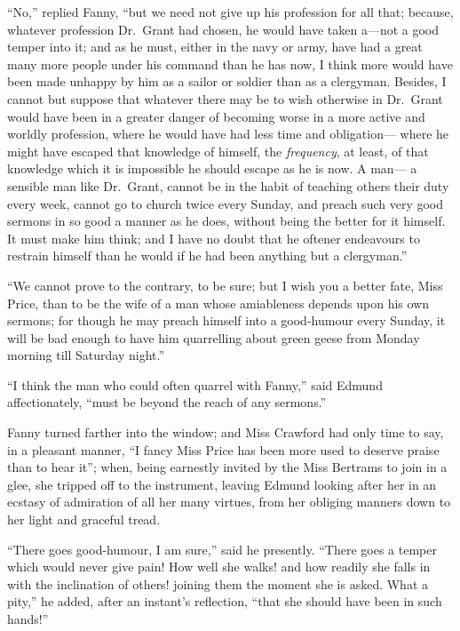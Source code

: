\documentclass{article}
\begin{document}
``No,'' replied Fanny, ``but we need not give up his profession
for all that; because, whatever profession Dr.\ Grant
had chosen, he would have taken a---not a good temper into it;
and as he must, either in the navy or army, have had a
great many more people under his command than he has now,
I think more would have been made unhappy by him as a
sailor or soldier than as a clergyman.  Besides, I cannot
but suppose that whatever there may be to wish otherwise
in Dr.\ Grant would have been in a greater danger of
becoming worse in a more active and worldly profession,
where he would have had less time and obligation---%
where he might have escaped that knowledge of himself,
the \emph{frequency}, at least, of that knowledge which it
is impossible he should escape as he is now.  A man---%
a sensible man like Dr.\ Grant, cannot be in the habit
of teaching others their duty every week, cannot go
to church twice every Sunday, and preach such very good
sermons in so good a manner as he does, without being
the better for it himself.  It must make him think;
and I have no doubt that he oftener endeavours to restrain
himself than he would if he had been anything but a clergyman.''

``We cannot prove to the contrary, to be sure; but I wish
you a better fate, Miss Price, than to be the wife of a man
whose amiableness depends upon his own sermons; for though
he may preach himself into a good-humour every Sunday,
it will be bad enough to have him quarrelling about green
geese from Monday morning till Saturday night.''

``I think the man who could often quarrel with Fanny,''
said Edmund affectionately, ``must be beyond the reach
of any sermons.''

Fanny turned farther into the window; and Miss
Crawford had only time to say, in a pleasant manner,
``I fancy Miss Price has been more used to deserve
praise than to hear it''; when, being earnestly invited
by the Miss Bertrams to join in a glee, she tripped off
to the instrument, leaving Edmund looking after her
in an ecstasy of admiration of all her many virtues,
from her obliging manners down to her light and graceful tread.

``There goes good-humour, I am sure,'' said he presently.
``There goes a temper which would never give pain!
How well she walks! and how readily she falls in with the
inclination of others! joining them the moment she is asked.
What a pity,'' he added, after an instant's reflection,
``that she should have been in such hands!''
\end{document}
